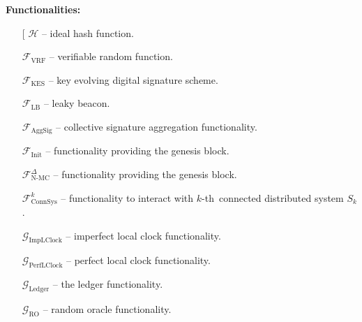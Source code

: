 \textbf{Functionalities:}
\begin{itemize}
    \item[\fontencoding[\ding{113}] $\mathcal{H}$ -- ideal hash function.
    \item[\ding{113}] $\mathcal{F}_{\text{VRF}}$ -- verifiable random function.
    \item[\ding{113}] $\mathcal{F}_{\text{KES}}$ -- key evolving digital signature scheme.
    \item[\ding{113}] $\mathcal{F}_{\text{LB}}$ -- leaky beacon.
    \item[\ding{113}] $\mathcal{F}_{\text{AggSig}}$ -- collective signature aggregation functionality.
    \item[\ding{113}] $\mathcal{F}_{\text{Init}}$ -- functionality providing the genesis block.
    \item[\ding{113}] $\mathcal{F}^{\Delta}_{\text{N-MC}}$ -- functionality providing the genesis block.
    \item[\ding{113}] $\mathcal{F}^k_{\text{ConnSys}}$ -- functionality to interact with $k$-th\
    connected distributed system $S_k$.
    \item[\ding{113}] $\mathcal{G}_{\text{ImpLClock}}$ -- imperfect local clock functionality.
    \item[\ding{113}] $\mathcal{G}_{\text{PerfLClock}}$ -- perfect local clock functionality.
    \item[\ding{113}] $\mathcal{G}_{\text{Ledger}}$ -- the ledger functionality.
    \item[\ding{113}] $\mathcal{G}_{\text{RO}}$ -- random oracle functionality.

\end{itemize}
\bigbreak

